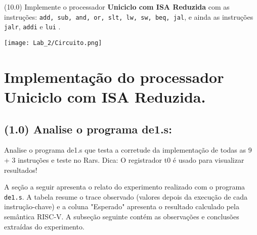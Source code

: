 \documentclass[12pt,a4paper]{article}
\begin{document}
(10.0) Implemente o processador \textbf{Uniciclo com ISA Reduzida} com as instruções:
\texttt{add, sub, and, or, slt, lw, sw, beq, jal}, e ainda as instruções \texttt{jalr}, \texttt{addi} e \texttt{lui} . 

\begin{center}
    \texttt{[image: Lab\_2/Circuito.png]}
\end{center}



\section{Implementação do processador Uniciclo com ISA Reduzida.}

\subsection{(1.0) Analise o programa de1.s:} Analise o programa de1.s que testa a corretude da implementação de todas as 9 + 3 instruções e
teste no Rars. Dica: O registrador t0 é usado para visualizar resultados!

A seção a seguir apresenta o relato do experimento realizado com o programa \texttt{de1.s}. A tabela resume o trace observado (valores depois da execução de cada instrução-chave) e a coluna "Esperado" apresenta o resultado calculado pela semântica RISC‑V. A subseção seguinte contém as observações e conclusões extraídas do experimento.
\end{document}
